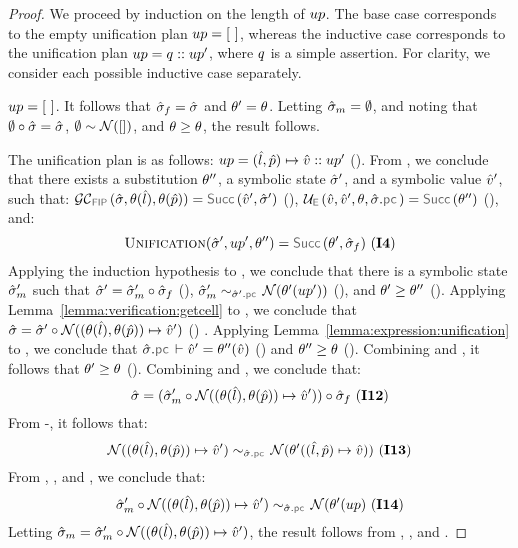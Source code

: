 \begin{proof}
We proceed by induction on the length of $up$. The base case corresponds to the empty unification plan $up = [ \ ]$, 
whereas the inductive case corresponds to the unification plan $up = q :: up'$, where $q$ is a simple 
assertion. For clarity, we consider each possible inductive case separately. 
\vspace{3pt}

\noindent {} $up = [ \ ]$. It follows that
$\hat{\sigma}_f = \hat{\sigma}$ and $\theta' = \theta$. Letting  $\hat{\sigma}_m = \emptyset$, 
and noting that $\emptyset \circ \hat{\sigma} = \hat{\sigma}$, $\emptyset \sim \mathcal{N}([])$, 
and $\theta \geq \theta$, the result follows. 
 \vspace{5pt}

\noindent {} The unification plan is as follows: 
$up = (\hat{l}, \hat{p}) \mapsto \hat{v} :: up'$ (). 
From , we conclude that there exists a substitution $\theta''$, a symbolic state $\hat{\sigma}'$, 
and a symbolic value $\hat{v}'$, such that: 
$\GetCellV{\sstate, \subst(\sloc), \subst(\sexprp)} = \success{\sexprv', \sstate'}$ (),
$\unifylexpr(\sexprv, \sexprv', \subst, \sstate.\pcsel) = \success{\subst''}$ (), and:
$$
\unificationfunction(\sstate', \up', \subst'') = \success{\subst', \sstate_f} \text{ (\ieq{4})}
$$ 
Applying the induction hypothesis to , we conclude that there is a symbolic state 
$\hat{\sigma}_m'$ such that  $\hat{\sigma}' = \hat{\sigma}_m' \circ \hat{\sigma}_f$ (), 
$\stateequivrel{\sstate_m'}{\normaliser(\subst'(\up'))}{\sstate'.\pcsel}$ (), and $\theta' \geq \theta''$ (). 
Applying Lemma~\ref{lemma:verification:getcell} to , we conclude that 
$\hat{\sigma} = \hat{\sigma}' \circ \mathcal{N}((\theta(\hat{l}), \theta(\hat{p})) \mapsto \hat{v}')$ () . 
Applying Lemma~\ref{lemma:expression:unification} to , we conclude that 
$\sstate.\pcsel \vdash \sexprv' = \subst''(\sexprv)$ () and $\theta'' \geq \theta$ (). 
Combining  and , it follows that $\theta' \geq \theta$ (). 
Combining  and , we conclude that: 
$$
\hat{\sigma} = (\hat{\sigma}_m' \circ \mathcal{N}((\theta(\hat{l}), \theta(\hat{p})) \mapsto \hat{v}')) \circ \hat{\sigma}_f  \text{ ({\bf I12})}
$$
From -, it follows that: 
$$
\stateequivrel{\normaliser((\subst(\sloc), \subst(\sexprp)) \pointsto \sexprv')}{\normaliser(\subst'((\sloc, \sexprp) \pointsto \sexprv))}{\sstate.\pcsel} \text{ (\ieq{13})}
$$
From , , and , we conclude that: 
$$
\stateequivrel{\sstate_m' \statecompose \normaliser((\subst(\sloc), \subst(\sexprp)) \pointsto \sexprv')}{\normaliser(\subst'(\up)}{\sstate.\pcsel} \text{ (\ieq{14})}
$$
Letting $\hat{\sigma}_m = \hat{\sigma}_m' \circ \mathcal{N}((\theta(\hat{l}), \theta(\hat{p})) \mapsto \hat{v}')$, the result follows 
from , , and . 
\vspace{5pt}


\end{proof}
